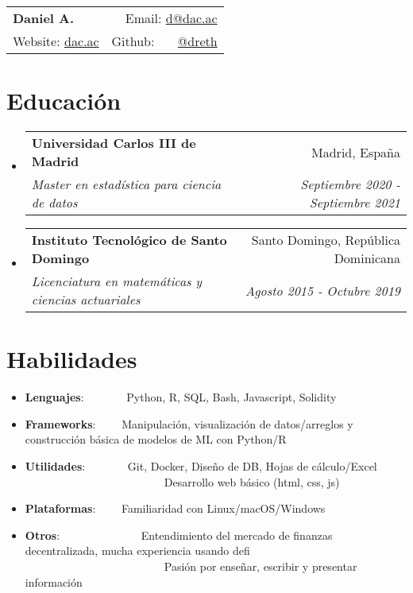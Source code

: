 \documentclass[a4paper,20pt]{article}
\makeatletter
\newcommand{\resumeItem}[2]{
  \item\small{
    \textbf{#1}{: #2 \vspace{-2pt}}
  }
}
\newcommand{\resumeSubheading}[4]{
  \vspace{-1pt}\item
    \begin{tabular*}{0.97\textwidth}{l@{\extracolsep{\fill}}r}
      \textbf{#1} & #2 \\
      \textit{#3} & \textit{#4} \\
    \end{tabular*}\vspace{-5pt}
}
\newcommand{\resumeSubItem}[2]{\resumeItem{#1}{#2}\vspace{-3pt}}
\newcommand{\resumeSubHeadingListStart}{\begin{itemize}[leftmargin=*]}
\newcommand{\resumeSubHeadingListEnd}{\end{itemize}}
\makeatother
\begin{document}
\begin{tabular*}{\textwidth}{l@{\extracolsep{\fill}}r}
  \textbf{{\LARGE Daniel A.}} & Email: {\color{blue}\href{mailto:}{d@dac.ac}}\\
  Website: {\color{blue}\href{https://dac.ac}{dac.ac}} & Github: ~~~{\color{blue}\href{https://github.com/dreth}{@dreth}}
\end{tabular*}




            
\vspace{-4pt}
\section{Educación}
\resumeSubHeadingListStart
        
  \resumeSubheading
    {Universidad Carlos III de Madrid}{Madrid, España}
    {Master en estadística para ciencia de datos}{Septiembre 2020 - Septiembre 2021}
\vspace{-2pt}
  \resumeSubheading
    {Instituto Tecnológico de Santo Domingo}{Santo Domingo, República Dominicana}
    {Licenciatura en matemáticas y ciencias actuariales}{Agosto 2015 - Octubre 2019}
\resumeSubHeadingListEnd


            
\vspace{-7pt}
\section{Habilidades}
  \resumeSubHeadingListStart
            
        
\vspace{-2pt}
\resumeSubItem{Lenguajes}{~~~~~~~Python, R, SQL, Bash, Javascript, Solidity}
\vspace{-2pt}
\resumeSubItem{Frameworks}{~~~~Manipulación, visualización de datos/arreglos y construcción básica de modelos de ML con Python/R}
\vspace{-2pt}
\resumeSubItem{Utilidades}{~~~~~~~Git, Docker, Diseño de DB, Hojas de cálculo/Excel\\~~~~~~~~~~~~~~~~~~~~~~~~~Desarrollo web básico (html, css, js)}
\vspace{-2pt}
\resumeSubItem{Plataformas}{~~~~Familiaridad con Linux/macOS/Windows}
\vspace{-2pt}
\resumeSubItem{Otros}{~~~~~~~~~~~~~~Entendimiento del mercado de finanzas decentralizada, mucha experiencia usando defi\\~~~~~~~~~~~~~~~~~~~~~~~~~Pasión por enseñar, escribir y presentar información}
\resumeSubHeadingListEnd
\end{document}
